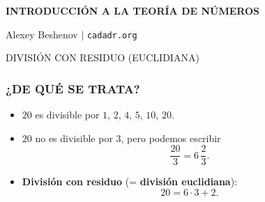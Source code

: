 



\begin{frame}
  \textbf{INTRODUCCIÓN A LA TEORÍA DE NÚMEROS}

  Alexey Beshenov $\mid$ \texttt{cadadr.org}

  \vfill

  \begin{center}\huge\headingfont
    DIVISIÓN CON RESIDUO (EUCLIDIANA)
  \end{center}

  \vfill
\end{frame}

\begin{frame}
  \frametitle{¿DE QUÉ SE TRATA?}

  \begin{itemize}
  \item<2-> $20$ es divisible por
    $1$, $2$, $4$, $5$, $10$, $20$.

  \item<3-> $20$ no es divisible por $3$, pero podemos escribir
    \[ \frac{20}{3} = 6\,\frac{2}{3}. \]

  \item<4-> \textbf{División con residuo} (= \textbf{división euclidiana}):
    \[ 20 = 6\cdot 3 + 2. \]
  \end{itemize}
\end{frame}

